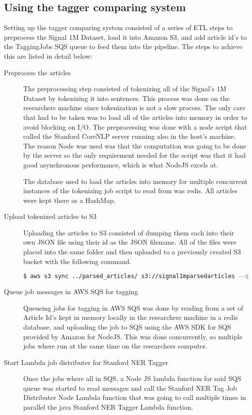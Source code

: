 \subsection{Using the tagger comparing system}\label{TaggingSignal}
Setting up the tagger comparing system consisted of a series of ETL steps to preprocess the Signal 1M Dataset, load it into Amazon S3, and add 
article id's to the TaggingJobs SQS queue to feed them into the pipeline.
The steps to achieve this are listed in detail below:
\begin{description}
\item[Preprocess the articles]
The preprocessing step consisted of tokenizing all of the Signal's 1M Dataset by tokenizing it into sentences.
This process was done on the researchers machine since tokenization is not a slow process.
The only care that had to be taken was to load all of the articles into memory in order to avoid blocking on I/O. 
The preprocessing was done with a node script that called the Stanford CoreNLP server running also in the host's machine.
The reason Node was used was that the computation was going to be done by the server so the only requirement needed for the script was that it had good
asynchronous performance, which is what NodeJS excels at.

The database used to load the articles into memory for multiple concurrent instances of the tokenizing job script to read from was redis\cite{redis}.
All articles were kept there as a HashMap.

\item[Upload tokenized articles to S3]
Uploading the articles to S3 consisted of dumping them each into their own JSON file using their id as the JSON filename.
All of the files were placed into the same folder and then uploaded to a previously created S3 bucket with the following command.
\begin{lstlisting}[language=bash]
  $ aws s3 sync ../parsed_articles/ s3://signal1mparsedarticles --quiet
\end{lstlisting}

\item[Queue job messages in AWS SQS for tagging]
Queueing jobs for tagging in AWS SQS was done by reading from a set of Article Id's kept in memory locally in the researchers machine in a redis database,
and uploading the job to SQS using the AWS SDK for SQS provided by Amazon for NodeJS.
This was done concurrently, so multiple jobs where run at the same time on the researchers computer.

\item[Start Lambda job distributer for Stanford NER Tagger]
Once the jobs where all in SQS, a Node JS lambda function for said SQS queue was started to read messages and call the Stanford NER Tag Job Distributer 
Node Lambda function that was going to call multiple times in parallel the java Stanford NER Tagger Lambda function.

\end{description}


